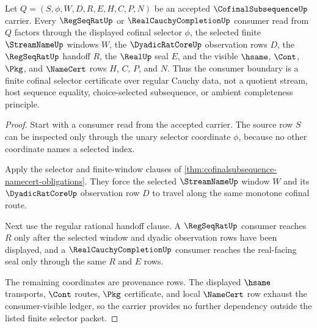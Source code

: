 \begin{theorem}
\label{thm:cofinalsubsequence-regseqrat-consumer-boundary}
Let $Q=(S,\phi,W,D,R,E,H,C,P,N)$ be an accepted $\CofinalSubsequenceUp$ carrier. Every $\RegSeqRatUp$ or $\RealCauchyCompletionUp$ consumer read from $Q$ factors through the displayed cofinal selector $\phi$, the selected finite $\StreamNameUp$ windows $W$, the $\DyadicRatCoreUp$ observation rows $D$, the $\RegSeqRatUp$ handoff $R$, the $\RealUp$ seal $E$, and the visible $\hsame$, $\Cont$, $\Pkg$, and $\NameCert$ rows $H$, $C$, $P$, and $N$. Thus the consumer boundary is a finite cofinal selector certificate over regular Cauchy data, not a quotient stream, host sequence equality, choice-selected subsequence, or ambient completeness principle.
\end{theorem}
\begin{proof}
Start with a consumer read from the accepted carrier. The source row $S$ can be inspected only through the unary selector coordinate $\phi$, because no other coordinate names a selected index.

Apply the selector and finite-window clauses of \autoref{thm:cofinalsubsequence-namecert-obligations}. They force the selected $\StreamNameUp$ window $W$ and its $\DyadicRatCoreUp$ observation row $D$ to travel along the same monotone cofinal route.

Next use the regular rational handoff clause. A $\RegSeqRatUp$ consumer reaches $R$ only after the selected window and dyadic observation rows have been displayed, and a $\RealCauchyCompletionUp$ consumer reaches the real-facing seal only through the same $R$ and $E$ rows.

The remaining coordinates are provenance rows. The displayed $\hsame$ transports, $\Cont$ routes, $\Pkg$ certificate, and local $\NameCert$ row exhaust the consumer-visible ledger, so the carrier provides no further dependency outside the listed finite selector packet.
\end{proof}

